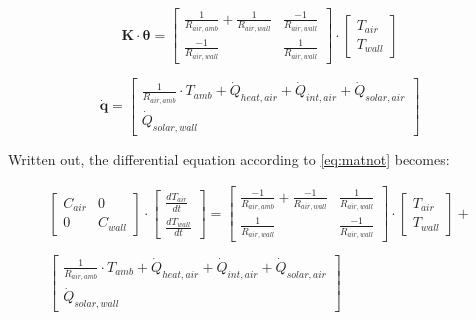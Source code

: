 \begin{equation}
	\mathbf{K} \cdot \boldsymbol{\theta} =
	\begin{bmatrix}
		\frac{1}{R_{air, amb}} + \frac{1}{R_{air, wall}} & \frac{-1}{R_{air, wall}} \\
		\frac{-1}{R_{air, wall}} &  \frac{1}{R_{air, wall}}
	\end{bmatrix}
	\cdot
	\begin{bmatrix}
		T_{air} \\
		T_{wall}
	\end{bmatrix}
\end{equation}

\begin{equation}
	\mathbf{\dot{q}} =
	\begin{bmatrix}
		\frac{1}{R_{air, amb}} \cdot T_{amb} + \dot{Q}_{heat, air} + \dot{Q}_{int, air} + \dot{Q}_{solar, air} \\
		\dot{Q}_{solar, wall}
	\end{bmatrix}
\end{equation}

Written out, the differential equation according to \eqref{eq:matnot} becomes:

\begin{equation}
	\begin{aligned}
		\begin{bmatrix}
			C_{air} & 0 \\
			0 &  C_{wall}
		\end{bmatrix}
		\cdot
		\begin{bmatrix}
			\frac{dT_{air}}{dt} \\
			\frac{dT_{wall}}{dt}
		\end{bmatrix}
		=
		\begin{bmatrix}
			\frac{-1}{R_{air, amb}} + \frac{-1}{R_{air, wall}} & \frac{1}{R_{air, wall}} \\
			\frac{1}{R_{air, wall}} &  \frac{-1}{R_{air, wall}}
		\end{bmatrix}
		\cdot
		\begin{bmatrix}
			T_{air} \\
			T_{wall}
		\end{bmatrix}
		+ \\ \\
		\begin{bmatrix}
			\frac{1}{R_{air, amb}} \cdot T_{amb} + \dot{Q}_{heat, air} + \dot{Q}_{int, air} + \dot{Q}_{solar, air} \\
			\dot{Q}_{solar, wall}
		\end{bmatrix}
	\end{aligned}
\end{equation}

